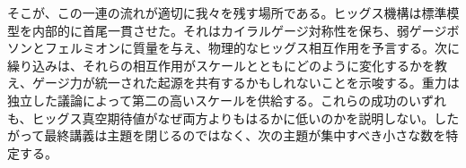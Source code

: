 \begin{classroomqa}
\end{classroomqa}

そこが、この一連の流れが適切に我々を残す場所である。ヒッグス機構は標準模型を内部的に首尾一貫させた。それはカイラルゲージ対称性を保ち、弱ゲージボソンとフェルミオンに質量を与え、物理的なヒッグス相互作用を予言する。次に繰り込みは、それらの相互作用がスケールとともにどのように変化するかを教え、ゲージ力が統一された起源を共有するかもしれないことを示唆する。重力は独立した議論によって第二の高いスケールを供給する。これらの成功のいずれも、ヒッグス真空期待値がなぜ両方よりもはるかに低いのかを説明しない。したがって最終講義は主題を閉じるのではなく、次の主題が集中すべき小さな数を特定する。